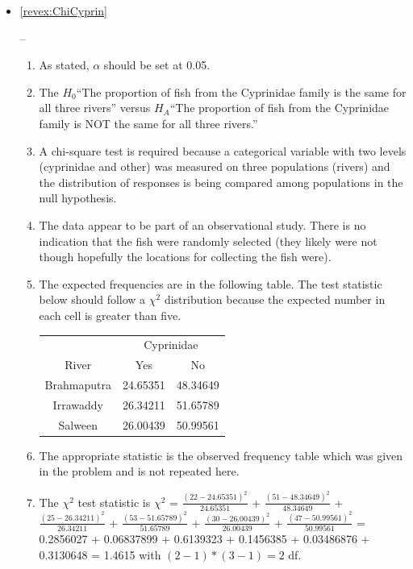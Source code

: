 \documentclass[10pt,openany]{book}\usepackage[]{graphicx}\usepackage[]{color}
\newenvironment{knitrout}{}{} %
\begin{document}
\begin{itemize}
\begin{knitrout}
\end{knitrout}
  \item \hypertarget{ans:ChiCyprin}{\ref{revex:ChiCyprin}} --
    \begin{enumerate}
      \item As stated, $\alpha$ should be set at 0.05.
      \item The $H_{0}$``The proportion of fish from the Cyprinidae family is the same for all three rivers'' versus $H_{A}$``The proportion of fish from the Cyprinidae family is NOT the same for all three rivers.''
      \item A chi-square test is required because a categorical variable with two levels (cyprinidae and other) was measured on three populations (rivers) and the distribution of responses is being compared among populations in the null hypothesis.
      \item The data appear to be part of an observational study.  There is no indication that the fish were randomly selected (they likely were not though hopefully the locations for collecting the fish were).
      \item The expected frequencies are in the following table.  The test statistic below should follow a $\chi^{2}$ distribution because the expected number in each cell is greater than five.
        \begin{center}
          \begin{tabular}{|c|c|c|}
            \multicolumn{1}{c}{} & \multicolumn{2}{c}{Cyprinidae} \\
            \cline{2-3}
            \multicolumn{1}{c|}{River} & Yes & No \\
            \hline
            Brahmaputra & 24.65351 & 48.34649 \\
            \hline
            Irrawaddy & 26.34211 & 51.65789 \\
            \hline
            Salween & 26.00439 & 50.99561 \\
            \hline
          \end{tabular}
        \end{center}
      \item The appropriate statistic is the observed frequency table which was given in the problem and is not repeated here.
      \item The $\chi^{2}$ test statistic is $\chi^{2}$ = $\frac{(22-24.65351)^{2}}{24.65351}$ + $\frac{(51-48.34649)^{2}}{48.34649}$ + $\frac{(25-26.34211)^{2}}{26.34211}$ + $\frac{(53-51.65789)^{2}}{51.65789}$ + $\frac{(30-26.00439)^{2}}{26.00439}$ + $\frac{(47-50.99561)^{2}}{50.99561}$ = 0.2856027 + 0.06837899 + 0.6139323 + 0.1456385 + 0.03486876 + 0.3130648 = 1.4615 with $(2-1)*(3-1)=2$ df.

\end{enumerate}
\end{itemize}
\end{document}
